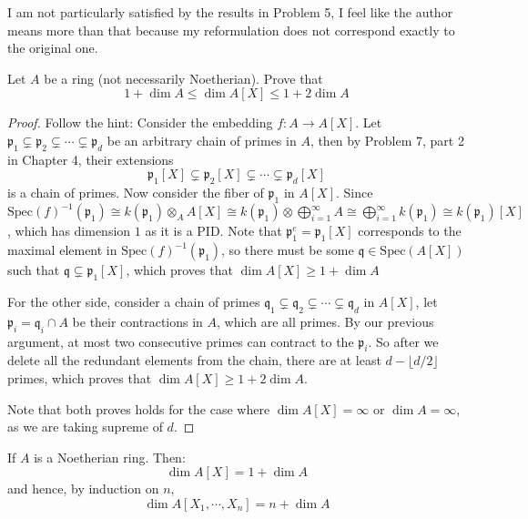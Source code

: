 \documentclass{solution}
\begin{document}
{\color{red} I am not particularly satisfied by the results in Problem 5, I feel like the author means more than that because my reformulation does not correspond exactly to the original one.}

\begin{problem}
    Let $A$ be a ring (not necessarily Noetherian). Prove that
    $$1 + \dim A \le \dim A[X] \le 1 + 2 \dim A$$
\end{problem}

\begin{proof}
    Follow the hint: Consider the embedding $f: A \rightarrow A[X]$. Let $\mathfrak{p}_1 \subsetneq \mathfrak{p}_2 \subsetneq \cdots \subsetneq \mathfrak{p}_d$ be an arbitrary chain of primes in $A$, then by Problem 7, part 2 in Chapter 4, their extensions
    $$\mathfrak{p}_1[X] \subsetneq \mathfrak{p}_2 [X] \subsetneq \cdots \subsetneq \mathfrak{p}_d[X]$$
    is a chain of primes. Now consider the fiber of $\mathfrak{p}_1$ in $A[X]$. Since $\mathrm{Spec}(f) ^{-1} (\mathfrak{p}_1) \cong k(\mathfrak{p}_1) \otimes_A A[X] \cong k(\mathfrak{p}_1) \otimes \bigoplus\limits_{i = 1}^{\infty} A \cong \bigoplus\limits_{i = 1}^{\infty} k(\mathfrak{p}_1) \cong k(\mathfrak{p}_1)[X]$, which has dimension $1$ as it is a PID. Note that $\mathfrak{p}_1^e = \mathfrak{p}_1[X]$ corresponds to the maximal element in $\mathrm{Spec}(f) ^{-1} (\mathfrak{p}_1)$, so there must be some $\mathfrak{q} \in \mathrm{Spec}(A[X])$ such that $\mathfrak{q} \subsetneq \mathfrak{p}_1[X]$, which proves that $\dim A[X] \ge 1 + \dim A$

    For the other side, consider a chain of primes $\mathfrak{q}_1 \subsetneq \mathfrak{q}_2 \subsetneq \cdots \subsetneq \mathfrak{q}_d$ in $A[X]$, let $\mathfrak{p}_i = \mathfrak{q}_i \cap A$ be their contractions in $A$, which are all primes. By our previous argument, at most two consecutive primes can contract to the $\mathfrak{p}_i$. So after we delete all the redundant elements from the chain, there are at least $d - \lfloor d / 2 \rfloor$ primes, which proves that $\dim A[X] \ge 1 + 2 \dim A$.

    Note that both proves holds for the case where $\dim A[X] = \infty$ or $\dim A = \infty$, as we are taking supreme of $d$.
\end{proof}

\begin{problem}
    If $A$ is a Noetherian ring. Then:
    $$\dim A[X] = 1 + \dim A$$
    and hence, by induction on $n$,
    $$\dim A[X_1, \cdots, X_n] = n + \dim A$$
\end{problem}
\end{document}
